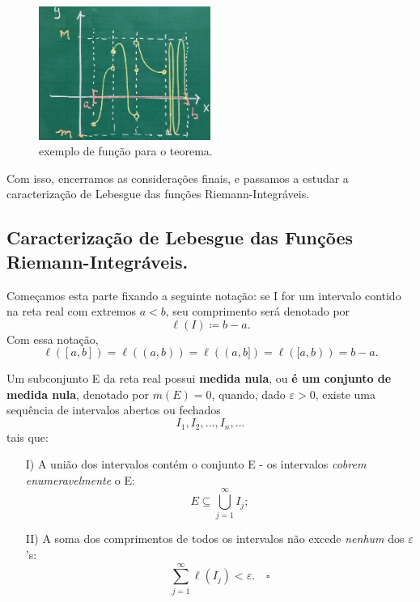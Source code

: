 \documentclass[../analysisII_notes.tex]{subfiles}
\begin{document}
\begin{figure}[H]
	\begin{center}
		\includegraphics[height=0.5\textheight, width=0.5\textwidth, keepaspectratio]{./Images/discontinuity_10.png}
	\end{center}
	\caption{exemplo de função para o teorema.}
	\label{discontinuity10}
\end{figure}

Com isso, encerramos as considerações finais, e passamos a estudar a caracterização de Lebesgue das funções Riemann-Integráveis.

\subsection{Caracterização de Lebesgue das Funções Riemann-Integráveis.}
Começamos esta parte fixando a seguinte notação: se I for um intervalo contido na reta real com extremos \(a < b\), seu comprimento será denotado por
\[
	\ell (I) \coloneqq b-a.
\]
Com essa notação,
\[
	\ell ([a, b]) = \ell ((a, b)) = \ell ((a, b]) = \ell ([a, b)) = b-a.
\]
\begin{def*}
	Um subconjunto E da reta real possui \textbf{medida nula}, ou \textbf{é um conjunto de medida nula}, denotado por \(m(E)=0\), quando, dado \(\varepsilon > 0\), existe uma sequência de intervalos abertos ou fechados
	\[
		I_1, I_2, \dotsc , I_{n}, \dotsc
	\]
	tais que:
	\begin{itemize}
		\item[I)] A união dos intervalos contém o conjunto E - os intervalos \textit{cobrem enumeravelmente} o E:
		      \[
			      E\subseteq \bigcup_{j=1}^{\infty}I_{j};
		      \]
		\item[II)] A soma dos comprimentos de todos os intervalos não excede \textit{nenhum} dos \(\varepsilon \)'s:
		      \[
			      \sum\limits_{j=1}^{\infty}\ell (I_{j}) <\varepsilon .\quad \square
		      \]
	\end{itemize}
\end{def*}
\end{document}
